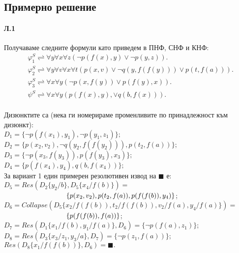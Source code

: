 \documentclass[12pt]{article}
\begin{document}
\subsection{Примерно решение}
\paragraph{\hspace{0.5em} Л.1}
\begin{addmargin}[1em]{2em}
Получаваме следните формули като приведем в ПНФ, СНФ и КНФ: \\
\begin{align*}
    &\varphi_1^S \rightleftharpoons \forall y \forall x \forall z (\neg p(f(x),y)\lor \neg p(y,z)).  \\
    &\varphi_2^S \rightleftharpoons \forall y \forall v \forall x \forall t(p(x, v) \lor \neg q(y, f(f(y))) \lor p(t,f(a))).  \\
    &\varphi_3^S \rightleftharpoons \forall x \forall y (\neg p(x, f(y))\lor p(f(y), x)).  \\
    &\psi^S \rightleftharpoons \forall x \forall y (p(f(x), y), \lor q(b, f(x))). \\
\end{align*}

Дизюнктите са (нека ги номерираме променливите по принадлежност към дизюнкт): \\
$D_1 = \{ \neg p(f(x_1),y_1),\neg p(y_1, z_1)\};$ \\
$D_2 = \{ p(x_2,v_2), \neg q(y_2, f(f(y_2))), p(t_2, f(a))\};$ \\
$D_3 = \{ \neg p(x_3, f(y_3)), p(f(y_3), x_3)\};$ \\
$D_4 = \{ p(f(x_4),y_4), q(b, f(x_4))\};$ \\

За вариант 1 един примерен резолютивен извод на $ \blacksquare $ е: \\
$ D_5 = Res(D_2\{y_2/b\}, D_5\{x_4/f(b)\}) = $\\$ \indent \indent \indent \indent \indent \indent \{ p(x_2, v_2), p(t_2, f(a)), p(f(f(b)), y_4) \}$; \\
$ D_6 = Collapse(D_5\{x_2/f(f(b)), t_2/f(f(b)), v_2/f(a), y_4/f(a)\}) = $\\$ \indent \indent \indent \indent \indent \indent \{p(f(f(b)),f(a))\}$; \\
$ D_7 = Res(D_1\{x_1/f(b), y_1/f(a)\}, D_6) =  \{ \neg p(f(a), z_1)\}$;\\
$ D_8 = Res(D_3\{x_3/z_1, y_3/a\}, D_7) = \{\neg p(z_1, f(a))\}$;\\
$ Res(D_8\{x_1/f(f(b))\}, D_6) = \blacksquare. $ \\
\end{addmargin}
\newpage
\end{document}
